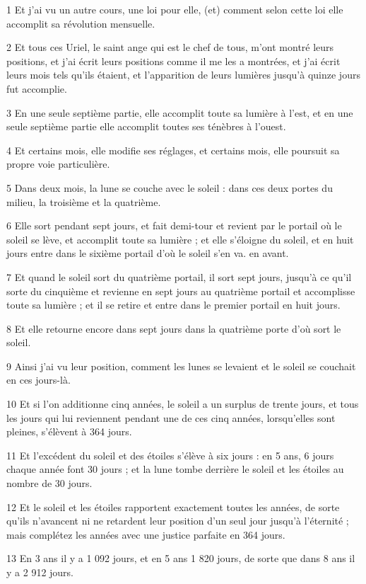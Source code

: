 \par 1 Et j'ai vu un autre cours, une loi pour elle, (et) comment selon cette loi elle accomplit sa révolution mensuelle.
\par 2 Et tous ces Uriel, le saint ange qui est le chef de tous, m'ont montré leurs positions, et j'ai écrit leurs positions comme il me les a montrées, et j'ai écrit leurs mois tels qu'ils étaient, et l'apparition de leurs lumières jusqu'à quinze jours fut accomplie.
\par 3 En une seule septième partie, elle accomplit toute sa lumière à l'est, et en une seule septième partie elle accomplit toutes ses ténèbres à l'ouest.
\par 4 Et certains mois, elle modifie ses réglages, et certains mois, elle poursuit sa propre voie particulière.
\par 5 Dans deux mois, la lune se couche avec le soleil : dans ces deux portes du milieu, la troisième et la quatrième.
\par 6 Elle sort pendant sept jours, et fait demi-tour et revient par le portail où le soleil se lève, et accomplit toute sa lumière ; et elle s'éloigne du soleil, et en huit jours entre dans le sixième portail d'où le soleil s'en va. en avant.
\par 7 Et quand le soleil sort du quatrième portail, il sort sept jours, jusqu'à ce qu'il sorte du cinquième et revienne en sept jours au quatrième portail et accomplisse toute sa lumière ; et il se retire et entre dans le premier portail en huit jours.
\par 8 Et elle retourne encore dans sept jours dans la quatrième porte d'où sort le soleil.
\par 9 Ainsi j'ai vu leur position, comment les lunes se levaient et le soleil se couchait en ces jours-là.
\par 10 Et si l'on additionne cinq années, le soleil a un surplus de trente jours, et tous les jours qui lui reviennent pendant une de ces cinq années, lorsqu'elles sont pleines, s'élèvent à 364 jours.
\par 11 Et l'excédent du soleil et des étoiles s'élève à six jours : en 5 ans, 6 jours chaque année font 30 jours ; et la lune tombe derrière le soleil et les étoiles au nombre de 30 jours.
\par 12 Et le soleil et les étoiles rapportent exactement toutes les années, de sorte qu'ils n'avancent ni ne retardent leur position d'un seul jour jusqu'à l'éternité ; mais complétez les années avec une justice parfaite en 364 jours.
\par 13 En 3 ans il y a 1 092 jours, et en 5 ans 1 820 jours, de sorte que dans 8 ans il y a 2 912 jours.
